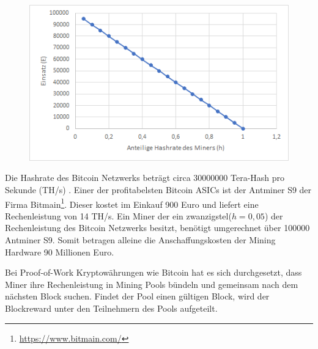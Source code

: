 \begin{figure}[H]
\centering
\includegraphics[width=1\linewidth]{Figures/hE}
\decoRule
\caption{}
\label{fig:eH}
\end{figure}





Die Hashrate des Bitcoin Netzwerks beträgt circa 30000000 Tera-Hash pro Sekunde (TH/s) \cite{blockchain_info_hashrate}. Einer der profitabelsten Bitcoin ASICs ist der Antminer S9 der Firma Bitmain\footnote{\url{https://www.bitmain.com/}}. Dieser kostet im Einkauf 900 Euro und liefert eine Rechenleistung von 14 TH/s. Ein Miner der ein zwanzigstel($h=0,05$) der Rechenleistung des Bitcoin Netzwerks besitzt, benötigt umgerechnet über 100000 Antminer S9. Somit betragen alleine die Anschaffungskosten der Mining Hardware 90 Millionen Euro.

Bei Proof-of-Work Kryptowährungen wie Bitcoin hat es sich durchgesetzt, dass Miner ihre Rechenleistung in Mining Pools bündeln und gemeinsam nach dem nächsten Block suchen. Findet der Pool einen gültigen Block, wird der Blockreward unter den Teilnehmern des Pools aufgeteilt.


